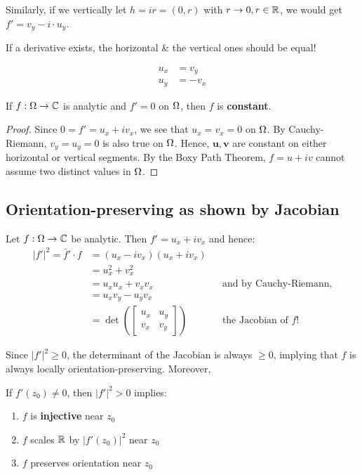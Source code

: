 \documentclass[12pt]{article}
\begin{document}
Similarly, if we vertically let $h=ir=(0,r)$ with $r\to 0, r\in \mathbb{R}$, we would get $f'=v_y-i\cdot u_y$.

\rmk If a derivative exists, the horizontal \& the vertical ones should be equal!

\begin{theorem}
    \begin{align*}
        u_x &=v_y\\
        u_y &= -v_x
    \end{align*}
\end{theorem}

\begin{corollary}
    If $f:\Omega \to \mathbb{C}$ is analytic and $f'=0$ on $\Omega$, then $f$ is \textbf{constant}.
\end{corollary}
\begin{proof}
    Since $0=f'=u_x+iv_x$, we see that $u_x=v_x=0$ on $\Omega$. By Cauchy-Riemann, $v_y=u_y=0$ is also true on $\Omega$. Hence, $\mathbf{u}, \mathbf{v}$ are constant on either horizontal or vertical segments. By the Boxy Path Theorem, $f=u+iv$ cannot assume two distinct values in $\Omega$.
\end{proof}

\subsection{Orientation-preserving as shown by Jacobian}
Let $f:\Omega \to \mathbb{C}$ be analytic. Then $f'=u_x+iv_x$ and hence:\begin{align*}
    |f'|^2 = \bar f'\cdot f &= (u_x-iv_x)(u_x+iv_x)\\
    &= u_x^2 + v_x^2\\
    &= u_xu_x+v_xv_x && \text{and by Cauchy-Riemann,}\\
    &= u_xv_y-u_yv_x\\
    &= \det\left(\begin{bmatrix}
        u_x & u_y\\
        v_x & v_y
    \end{bmatrix}\right) && \text{the Jacobian of $f$!}
\end{align*}

Since $|f'|^2\geq 0$, the determinant of the Jacobian is always $\geq 0$, implying that $f$ is always locally orientation-preserving. Moreover,

\begin{proposition}
    If $f'(z_0)\neq 0$, then $|f'|^2> 0$ implies:
    \begin{enumerate}
        \item $f$ is \textbf{injective} near $z_0$
        \item $f$ scales $\mathbb{R}$ by $|f'(z_0)|^2$ near $z_0$
        \item $f$ preserves orientation near $z_0$
    \end{enumerate}
\end{proposition}
\end{document}
